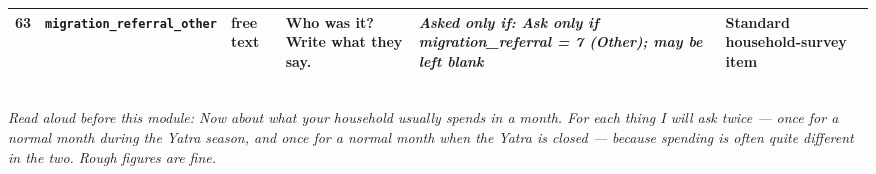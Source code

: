 \documentclass[9pt,a4paper,landscape]{article}
\begin{document}
\begin{longtable}{@{}p{0.5cm}p{3.3cm}p{1.7cm}p{7.3cm}p{5.6cm}p{5.4cm}@{}}
\footnotesize 63 & \footnotesize\texttt{migration\_referral\_other} & \scriptsize free text & \footnotesize Who was it? Write what they say.\par\vspace{1pt}{\footnotesize\color{hdr}{\hifont वे कौन थे? जैसा वे बताएँ वैसा लिख लीजिए।}} & \scriptsize \textit{Asked only if: Ask only if migration\_referral = 7 (Other); may be left blank} & \scriptsize Standard household-survey item\\
\bottomrule\end{longtable}\vspace{6pt}
\\[3pt]
{\small\itshape Read aloud before this module: Now about what your household usually spends in a month. For each thing I will ask twice — once for a normal month during the Yatra season, and once for a normal month when the Yatra is closed — because spending is often quite different in the two. Rough figures are fine.}\\[5pt]
\end{document}
